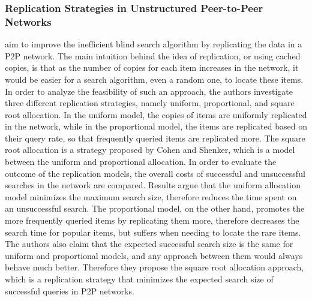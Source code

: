 \subsubsection{Replication Strategies in Unstructured Peer-to-Peer Networks}
\cite{CS2002} aim to improve the inefficient blind search algorithm by
replicating the data in a P2P network. The main intuition behind the
idea of replication, or using cached copies, is that as the number of copies for
each item increases in the network, it would be easier for a search algorithm,
even a random one, to locate these items. In order to analyze the feasibility of
such an approach, the authors investigate three different replication
strategies, namely uniform, proportional, and square root allocation. In the
uniform model, the copies of items are uniformly replicated in the network,
while in the proportional model, the items are replicated based on their query
rate, so that frequently queried items are replicated more. The square root
allocation is a strategy proposed by Cohen and Shenker, which is a model between
the uniform and proportional allocation.  In order to evaluate the outcome of
the replication models, the overall costs of successful and unsuccessful
searches in the network are compared. Results argue that the uniform allocation
model minimizes the maximum search size, therefore reduces the time spent on an
unsuccessful search. The proportional model, on the other hand, promotes the
more frequently queried items by replicating them more, therefore decreases the
search time for popular items, but suffers when needing to locate the rare
items. The authors also claim that the expected successful search size is the
same for uniform and proportional models, and any approach between them would
always behave much better. Therefore they propose the square root allocation
approach, which is a replication strategy that minimizes the expected search
size of successful queries in P2P networks.

